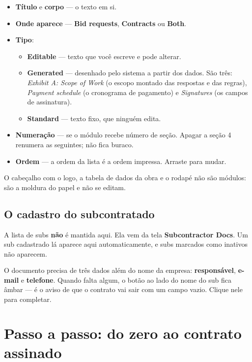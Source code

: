 \documentclass[11pt,a4paper]{article}
\newcommand{\ui}[1]{\textbf{\textsf{#1}}}
\begin{document}
\begin{itemize}
  \item \textbf{Título} e \textbf{corpo} — o texto em si.
  \item \textbf{Onde aparece} — \ui{Bid requests}, \ui{Contracts} ou \ui{Both}.
  \item \textbf{Tipo}:
  \begin{itemize}
    \item \ui{Editable} — texto que você escreve e pode alterar.
    \item \ui{Generated} — desenhado pelo sistema a partir dos dados. São três:
    \emph{Exhibit A: Scope of Work} (o escopo montado das respostas e das
    regras), \emph{Payment schedule} (o cronograma de pagamento) e
    \emph{Signatures} (os campos de assinatura).
    \item \ui{Standard} — texto fixo, que ninguém edita.
  \end{itemize}
  \item \textbf{Numeração} — se o módulo recebe número de seção. Apagar a seção 4
  renumera as seguintes; não fica buraco.
  \item \textbf{Ordem} — a ordem da lista é a ordem impressa. Arraste para mudar.
\end{itemize}

O cabeçalho com o logo, a tabela de dados da obra e o rodapé não são módulos: são
a moldura do papel e não se editam.

\subsection{O cadastro do subcontratado}

A lista de subs \textbf{não} é mantida aqui. Ela vem da tela
\ui{Subcontractor Docs}. Um sub cadastrado lá aparece aqui automaticamente, e
subs marcados como inativos não aparecem.

O documento precisa de três dados além do nome da empresa: \textbf{responsável},
\textbf{e-mail} e \textbf{telefone}. Quando falta algum, o botão ao lado do nome
do sub fica âmbar — é o aviso de que o contrato vai sair com um campo vazio.
Clique nele para completar.

\section{Passo a passo: do zero ao contrato assinado}
\end{document}
